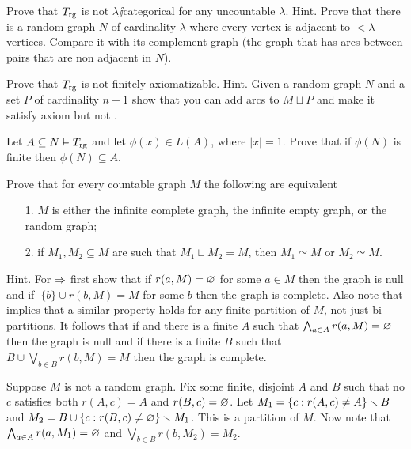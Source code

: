 \documentclass[creche.tex]{subfiles}
\begin{document}
%

\begin{exercise}
Prove that $T_{\rm rg}$ is not $\lambda\jj$categorical for any uncountable $\lambda$. Hint. Prove that there is a random graph $N$ of cardinality $\lambda$ where every vertex is adjacent to $<\lambda$ vertices. Compare it with its complement graph (the graph that has arcs between pairs that are non adjacent in $N$).\QED
\end{exercise}

\begin{exercise}
Prove that $T_{\rm rg}$ is not finitely axiomatizable. Hint. Given a random graph $N$ and a set $P$ of cardinality $n+1$ show that you can add arcs to $M\sqcup P$ and make it satisfy axiom  but not .\QED
\end{exercise}

\begin{exercise}\label{ex_rg_small_def_set}
Let $A\subseteq N\models T_{\rm rg}$ and let $\phi(x)\in L(A)$, where $|x|=1$. Prove that if $\phi(N)$ is finite then $\phi(N)\subseteq A$.\QED
\end{exercise}

\begin{exercise}
Prove that for every countable graph $M$ the following are equivalent
\begin{itemize}
\item[1.] $M$ is either the infinite complete graph, the infinite empty graph, or the random graph;
\item[2.] if $M_1,M_2\subseteq M$ are such that $M_1\sqcup M_2=M$, then $M_1\simeq M$ or $M_2\simeq M$.
\end{itemize}
Hint. For $\IMP$ first show that if $r(a,M)=\0$ for some $a\in M$ then the graph is null and if $\
\{b\}\cup r(b,M)=M$ for some $b$ then the graph is complete. Also note that  implies that a similar property holds for any finite partition of $M$, not just bi-partitions. It follows that if  and there is a finite $A$ such that $\bigwedge_{a\in A}r(a, M)=\0$ then the graph is null and if there is a finite $B$ such that $B\cup\bigvee_{b\in B}r(b,M)=M$ then the graph is complete. 

Suppose $M$ is not a random graph. Fix some finite, disjoint $A$ and $B$ such that no $c$ satisfies both $r(A,c)= A$ and $r(B,c)=\0$. Let $M_1=\{c:r(A,c)\neq A\}\sm B$ and $M_2=B\cup\{c:r(B,c)\neq\0\}\sm M_1$. This is a partition of $M$. Now note that $\bigwedge_{a\in A}r(a, M_1)=\0$ and $\bigvee_{b\in B}r(b, M_2)=M_2$.\QED
\end{exercise}
\end{document}
